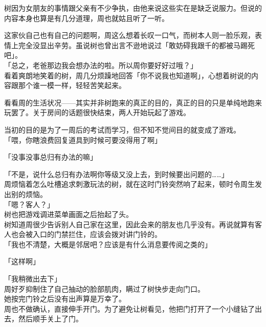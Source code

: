 树因为女朋友的事情跟父亲有不少争执，由他来说这些实在是缺乏说服力。但说的内容本身也算是有几分道理，周也就姑且听了一听。

这家伙自己也有自己的问题啊，周这么想着长叹一口气，而树本人则一脸乐观，表情上完全没显出辛劳。虽说树也曾出言不逊地说过「敢妨碍我跟千的都被马踢死吧」。\\

「总之，老爸那边我会想办法的啦。所以周你要好好过哦？」\\

看着爽朗地笑着的树，周几分烦躁地回答「你不说我也知道啊」，心想着树说的内容跟那个谁一模一样，轻轻苦笑起来。\\

\vspace{2\baselineskip}

看看周的生活状况——其实并非树跑来的真正的目的，真正的目的只是单纯地跑来玩罢了。关于房间的话题很快结束，两人开始玩起了游戏。

当初的目的是为了一周后的考试而学习，但不知不觉间目的就变成了游戏。\\

「喂，你瞎浪费回复道具到时候可要没得用了啊」

「没事没事总归有办法的嘛」

「不是，说什么总归有办法啊你等级又没上去，到时候要出问题的……」\\

周烦恼着怎么吐槽追求刺激玩法的树，就在这时门铃突然响了起来，顿时令周生发出别的烦恼。\\

「嗯？客人？」\\

树也把游戏调进菜单画面之后抬起了头。\\

树知道周很少告诉别人自己家在这里，因此会来的朋友也几乎没有。再说就算有客人也会被入口的门禁拦住，应该会拨对讲门铃的。\\

「我也不清楚，大概是邻居吧？应该是有什么消息要传阅之类的」

「这样啊」

「我稍微出去下」\\

周好歹抑制住了自己抽动的脸部肌肉，瞒过了树快步走向门口。\\

她按完门铃之后没有出声算是万幸了。\\

周也不做确认，直接伸手开门。为了避免让树看见，他把门打开了一个小缝钻了出去，然后顺手关上了门。\\

